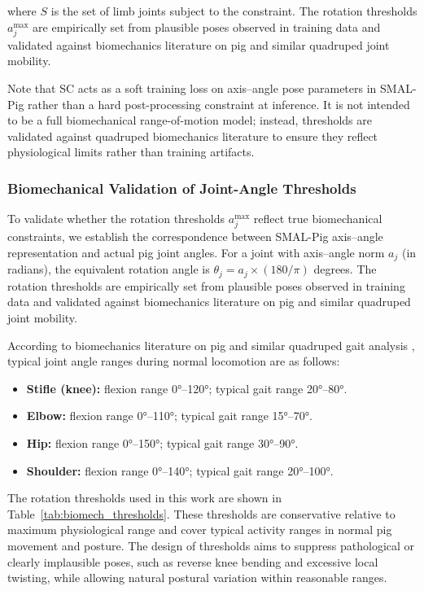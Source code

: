 \documentclass[computers,article,submit,pdftex,moreauthors]{mdpi}
\begin{document}
where $S$ is the set of limb joints subject to the constraint. The rotation thresholds $a_j^{\max}$ are empirically set from plausible poses observed in training data and validated against biomechanics literature on pig and similar quadruped joint mobility.

Note that SC acts as a soft training loss on axis--angle pose parameters in SMAL-Pig rather than a hard post-processing constraint at inference. It is not intended to be a full biomechanical range-of-motion model; instead, thresholds are validated against quadruped biomechanics literature to ensure they reflect physiological limits rather than training artifacts.

\subsubsection{Biomechanical Validation of Joint-Angle Thresholds}\label{sec:biomech_validation}

To validate whether the rotation thresholds $a_j^{\max}$ reflect true biomechanical constraints, we establish the correspondence between SMAL-Pig axis--angle representation and actual pig joint angles. For a joint with axis--angle norm $a_j$ (in radians), the equivalent rotation angle is $\theta_j = a_j \times (180/\pi)$ degrees. The rotation thresholds are empirically set from plausible poses observed in training data and validated against biomechanics literature on pig and similar quadruped joint mobility.

According to biomechanics literature on pig and similar quadruped gait analysis \cite{ref29,ref30,ref31}, typical joint angle ranges during normal locomotion are as follows:

\begin{itemize}
  \item \textbf{Stifle (knee):} flexion range 0°--120°; typical gait range 20°--80°.
  \item \textbf{Elbow:} flexion range 0°--110°; typical gait range 15°--70°.
  \item \textbf{Hip:} flexion range 0°--150°; typical gait range 30°--90°.
  \item \textbf{Shoulder:} flexion range 0°--140°; typical gait range 20°--100°.
\end{itemize}

The rotation thresholds used in this work are shown in Table~\ref{tab:biomech_thresholds}. These thresholds are conservative relative to maximum physiological range and cover typical activity ranges in normal pig movement and posture. The design of thresholds aims to suppress pathological or clearly implausible poses, such as reverse knee bending and excessive local twisting, while allowing natural postural variation within reasonable ranges.
\end{document}
